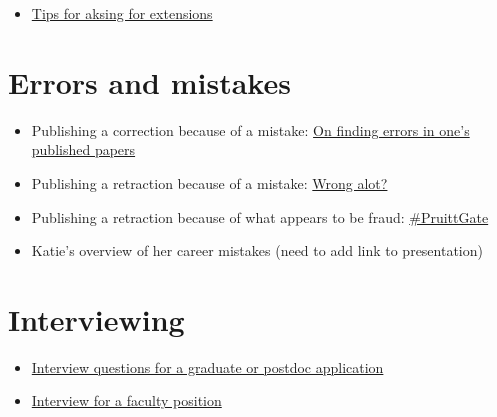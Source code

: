 \documentclass[
  letterpaper,
  DIV=11,
  numbers=noendperiod]{scrreprt}
\providecommand{\tightlist}{%
  \setlength{\itemsep}{0pt}\setlength{\parskip}{0pt}}\usepackage{longtable,booktabs,array}
\begin{document}

\begin{itemize}
\tightlist
\item
  \href{https://docs.google.com/document/d/1o87Ua79CeVIQstDpy9m9DtGsZTL9ttFmVB-Kqus1Iig/edit}{Tips
  for aksing for extensions}
\end{itemize}

\hypertarget{errors-and-mistakes}{%
\section*{\texorpdfstring{\textbf{Errors and
mistakes}}{Errors and mistakes}}\label{errors-and-mistakes}}


\begin{itemize}
\item
  Publishing a correction because of a mistake:
  \href{https://dynamicecology.wordpress.com/2016/12/02/on-finding-errors-in-ones-published-analyses/}{On
  finding errors in one's published papers}
\item
  Publishing a retraction because of a mistake:
  \href{http://ecoevoevoeco.blogspot.com/2016/12/wrong-lot.html\%20http://ecoevoevoeco.blogspot.com/2016/12/wrong-lot.html}{Wrong
  alot?}
\item
  Publishing a retraction because of what appears to be fraud:
  \href{https://laskowskilab.faculty.ucdavis.edu/2020/01/29/retractions/}{\#PruittGate}
\item
  Katie's overview of her career mistakes (need to add link to
  presentation)
\end{itemize}

\hypertarget{interviewing}{%
\section*{\texorpdfstring{\textbf{Interviewing}}{Interviewing}}\label{interviewing}}


\begin{itemize}
\item
  \href{https://docs.google.com/document/d/1SM3PiIfo4f_Pd_NZxC4Br1g5E0mnqCUlwilrleatNWA/edit}{Interview
  questions for a graduate or postdoc application}
\item
  \href{https://docs.google.com/document/d/1OvvB6yl_5l05dUn3frL5GEJeksc5xjy8a_keq8sp0fc/edit}{Interview
  for a faculty position}
\end{itemize}
\end{document}

